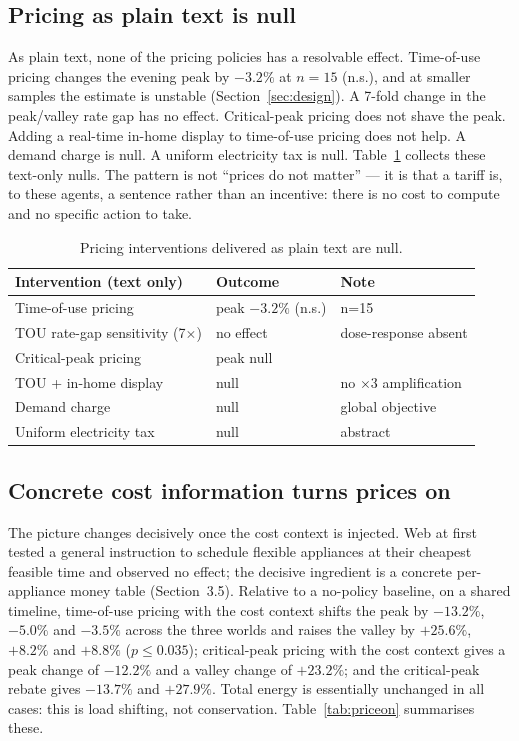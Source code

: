 \documentclass[11pt]{article}
\begin{document}
\subsection{Pricing as plain text is null}
As plain text, none of the pricing policies has a resolvable effect. Time-of-use pricing changes the
evening peak by $-3.2\%$ at $n=15$ (n.s.), and at smaller samples the estimate is unstable (Section~\ref{sec:design}).
A 7-fold change in the peak/valley rate gap has no effect. Critical-peak pricing does not shave the peak.
Adding a real-time in-home display to time-of-use pricing does not help. A demand charge is null. A
uniform electricity tax is null. Table~\ref{tab:pricenull} collects these text-only nulls. The pattern is
not ``prices do not matter'' --- it is that a tariff is, to these agents, a sentence rather than an
incentive: there is no cost to compute and no specific action to take.

\begin{table}[ht]
\centering\small
\begin{tabular}{lll}
\toprule
Intervention (text only) & Outcome & Note \\
\midrule
Time-of-use pricing & peak $-3.2\%$ (n.s.) & n=15 \\
TOU rate-gap sensitivity (7$\times$) & no effect & dose-response absent \\
Critical-peak pricing & peak null & \\
TOU + in-home display & null & no $\times$3 amplification \\
Demand charge & null & global objective \\
Uniform electricity tax & null & abstract \\
\bottomrule
\end{tabular}
\caption{Pricing interventions delivered as plain text are null.}
\label{tab:pricenull}
\end{table}

\subsection{Concrete cost information turns prices on}
\label{sec:price}
The picture changes decisively once the cost context is injected. Web at first tested a general
instruction to schedule flexible appliances at their cheapest feasible time and observed no effect; the
decisive ingredient is a concrete per-appliance money table (Section~3.5). Relative to a no-policy
baseline, on a shared timeline, time-of-use pricing with the cost context shifts the peak by $-13.2\%$,
$-5.0\%$ and $-3.5\%$ across the three worlds and raises the valley by $+25.6\%$, $+8.2\%$ and $+8.8\%$
($p\le0.035$); critical-peak pricing with the cost context gives a peak change of $-12.2\%$ and a valley
change of $+23.2\%$; and the critical-peak rebate gives $-13.7\%$ and $+27.9\%$. Total energy is
essentially unchanged in all cases: this is load shifting, not conservation. Table~\ref{tab:priceon}
summarises these.
\end{document}
